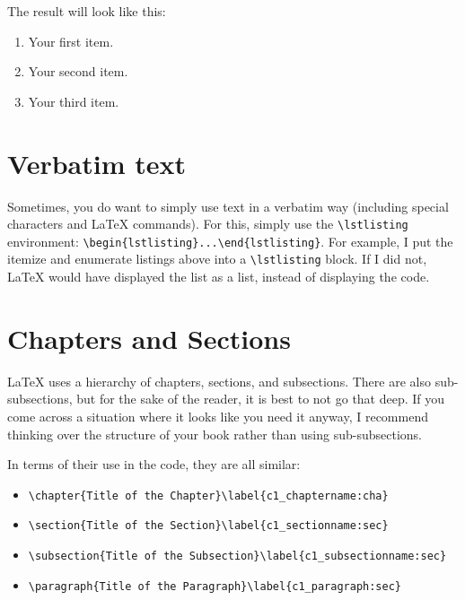The result will look like this:%
\begin{enumerate}
	\item Your first item.
	\item Your second item.
	\item Your third item.
\end{enumerate}


\section{Verbatim text}\label{c1_verbatim:sec}

Sometimes, you do want to simply use text in a verbatim way (including special
characters and \LaTeX{} commands). For this, simply use the
\lstinline[language=Tex]!\lstlisting! environment:
\lstinline[language=Tex]!\begin{lstlisting}...\end{lstlisting}!. For example, I
put the itemize and enumerate listings above into a
\lstinline[language=Tex]!\lstlisting! block. If I did not, \LaTeX{} would have
displayed the list as a list, instead of displaying the code.



\section{Chapters and Sections}\label{c1_chaptersandsections:sec}

\LaTeX{} uses a hierarchy of chapters, sections, and subsections. There are also
sub-subsections, but for the sake of the reader, it is best to not go that deep.
If you come across a situation where it looks like you need it anyway, I
recommend thinking over the structure of your book rather than using
sub-subsections. 

In terms of their use in the code, they are all similar:

\begin{itemize}
    \item \lstinline[language=Tex]!\chapter{Title of the Chapter}\label{c1_chaptername:cha}!
    \item \lstinline[language=Tex]!\section{Title of the Section}\label{c1_sectionname:sec}!
    \item \lstinline[language=Tex]!\subsection{Title of the Subsection}\label{c1_subsectionname:sec}!
    \item \lstinline[language=Tex]!\paragraph{Title of the Paragraph}\label{c1_paragraph:sec}!
\end{itemize}

